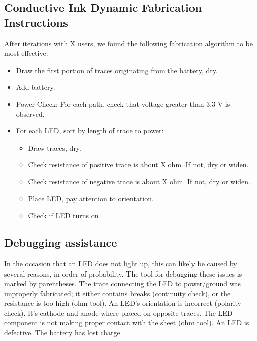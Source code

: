 \documentclass{sigchi}
\begin{document}
        \subsection{Conductive Ink Dynamic Fabrication Instructions}
        After iterations with X users, we found the following fabrication algorithm to be most effective. 
        \begin{itemize}
            \item Draw the first portion of traces originating from the battery, dry.
            \item Add battery. 
            \item Power Check: For each path, check that voltage greater than 3.3 V is observed. 
            \item For each LED, sort by length of trace to power:
            \begin{itemize}
                \item Draw traces, dry. 
                \item Check resistance of positive trace is about X ohm. If not, dry or widen. 
                \item Check resistance of negative trace is about X ohm. If not, dry or widen. 
                \item Place LED, pay attention to orientation.
                \item Check if LED turns on
            \end{itemize}
        \end{itemize}
    
    \subsection{Debugging assistance}
        In the occasion that an LED does not light up, this can likely be caused by several reasons, in order of probability.  The tool for debugging these issues is marked by parentheses. 
        The trace connecting the LED to power/ground was improperly fabricated; it either contains breaks (continuity check), or the resistance is too high (ohm tool). 
        An LED's orientation is incorrect (polarity check). It's cathode and anode where placed on opposite traces. 
        The LED component is not making proper contact with the sheet (ohm tool). 
        An LED is defective. 
        The battery has lost charge. 
\end{document}
